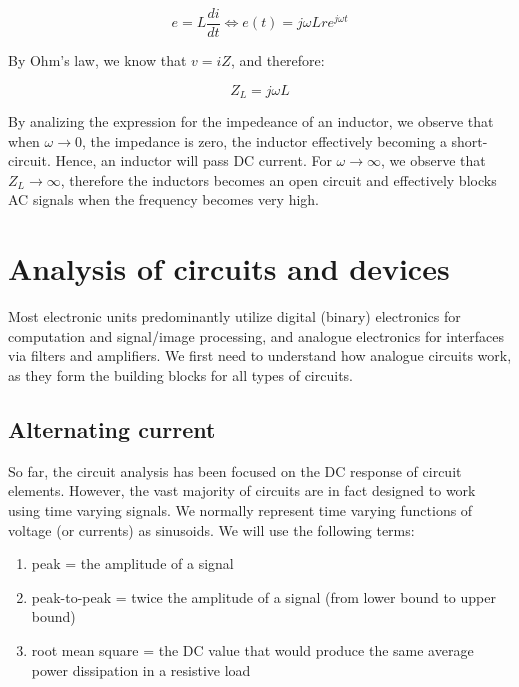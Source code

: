 \documentclass{article}
\begin{document}
\begin{proposition}
\begin{proposition}
\[ e = L\frac{di}{dt} \iff e(t) = j\omega Lre^{j\omega t} \]

By Ohm's law, we know that $v = iZ$, and therefore:

\[ Z_L = j\omega L \]
    
\end{proposition}

By analizing the expression for the impedeance of an inductor, we observe that when $\omega \to 0$, the impedance is zero, the inductor effectively becoming a short-circuit. Hence, an inductor will pass DC current. For $\omega \to \infty$, we observe that $Z_L \to \infty$, therefore the inductors becomes an open circuit and effectively blocks AC signals when the frequency becomes very high.

\end{proposition}

\newpage

\section{Analysis of circuits and devices}

Most electronic units predominantly utilize digital (binary) electronics for computation and signal/image processing, and analogue electronics for interfaces via filters and amplifiers. We first need to understand how analogue circuits work, as they form the building blocks for all types of circuits.

\subsection{Alternating current}

So far, the circuit analysis has been focused on the DC response of circuit elements. However, the vast majority of circuits are in fact designed to work using time varying signals. We normally represent time varying functions of voltage (or currents) as sinusoids. We will use the following terms:

\begin{enumerate}
    \item peak = the amplitude of a signal
    \item peak-to-peak = twice the amplitude of a signal (from lower bound to upper bound)
    \item root mean square = the DC value that would produce the same average power dissipation in a resistive load
\end{enumerate}
\end{document}
